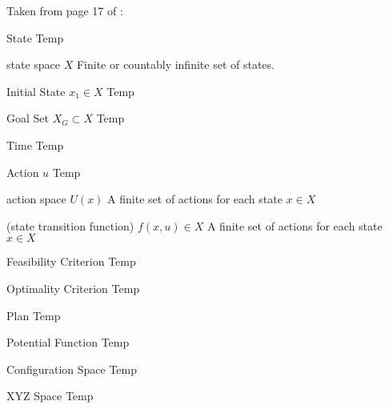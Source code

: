 Taken from page 17 of \cite{lavalle2006planning}:

\begin{definition}{State}
Temp
\end{definition}

\begin{definition}{state space $X$}
Finite or countably infinite set of states.
\end{definition}

\begin{definition}{Initial State $x_1 \in X$}
Temp
\end{definition}

\begin{definition}{Goal Set $X_G \subset X$}
Temp
\end{definition}

\begin{definition}{Time}
Temp
\end{definition}

\begin{definition}{Action $u$}
Temp
\end{definition}

\begin{definition}{action space $U(x)$}
A finite set of actions for each state $x \in X$
\end{definition}

\begin{definition}{(state transition function)}
 $f(x,u) \in X$
A finite set of actions for each state $x \in X$
\end{definition}

\begin{definition}{Feasibility Criterion}
Temp
\end{definition}

\begin{definition}{Optimality Criterion}
Temp
\end{definition}

\begin{definition}{Plan}
Temp
\end{definition}

\begin{definition}{Potential Function}
Temp
\end{definition}

\begin{definition}{Configuration Space}
Temp
\end{definition}

\begin{definition}{XYZ Space}
Temp
\end{definition}

